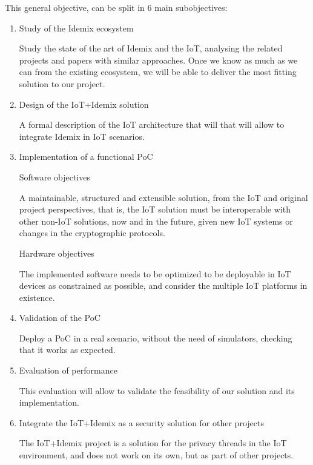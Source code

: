 This general objective, can be split in 6 main subobjectives: 



\begin{enumerate}
	\item Study of the Idemix ecosystem
	
	Study the state of the art of Idemix and the IoT, analysing the related projects and papers with similar approaches. Once we know as much as we can from the existing ecosystem, we will be able to deliver the most fitting solution to our project.
	
	\item Design of the IoT+Idemix solution
	
	A formal description of the IoT architecture that will that will allow to integrate Idemix in IoT scenarios.
	
	
	\item Implementation of a functional PoC
	
	\subitem Software objectives
	
	A maintainable, structured and extensible solution, from the IoT and original project perspectives, that is, the IoT solution must be interoperable with other non-IoT solutions, now and in the future, given new IoT systems or changes in the cryptographic protocols.
	
	\subitem Hardware objectives
	
	The implemented software needs to be optimized to be deployable in IoT devices as constrained as possible, and consider the multiple IoT platforms in existence.
	
	
	\item Validation of the PoC
	
	Deploy a \ac{PoC} in a real scenario, without the need of simulators, checking that it works as expected.
	
	\item Evaluation of performance
	
	This evaluation will allow to validate the feasibility of our solution and its implementation.
	
	\item Integrate the IoT+Idemix as a security solution for other projects
	
	The IoT+Idemix project is a solution for the privacy threads in the IoT environment, and does not work on its own, but as part of other projects.
	
\end{enumerate}





